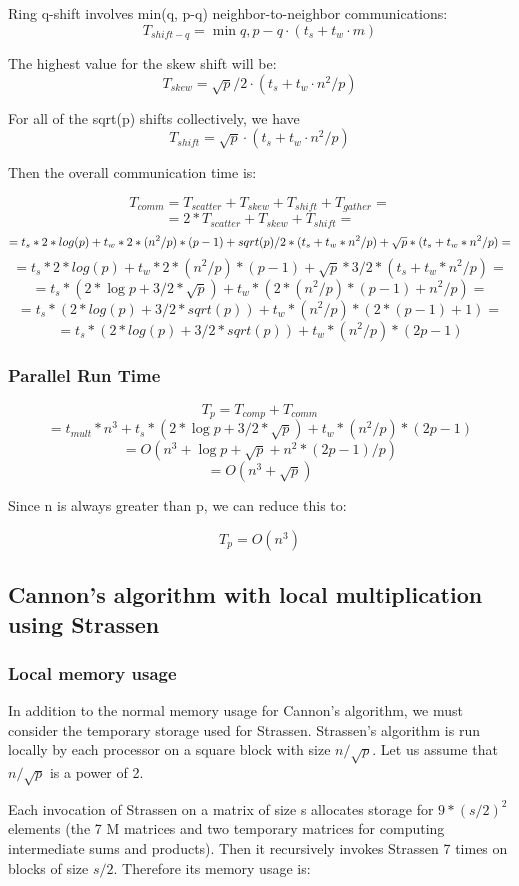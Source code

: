 \documentclass{article}
\begin{document}
Ring q-shift involves min(q, p-q) neighbor-to-neighbor communications:
$$T_{{shift-q}} = \min{q,p-q} \cdot (t_s + t_w \cdot m)$$

The highest value for the skew shift will be:
$$T_{{skew}} = \sqrt{p}/2 \cdot (t_s + t_w \cdot n^2/p)$$

For all of the sqrt(p) shifts collectively, we have
$$T_{{shift}} = \sqrt{p} \cdot (t_s + t_w \cdot n^2/p)$$

Then the overall communication time is:

$$T_{{comm}} = T_{{scatter}} + T_{{skew}} + T_{{shift}} + T_{{gather}} =$$
$$= 2*T_{{scatter}} + T_{{skew}} + T_{{shift}} =$$
$$= t_s*2*log(p) + t_w*2*(n^2/p)*(p-1) + sqrt(p)/2 * (t_s + t_w*n^2/p) + \\
\sqrt{p}*(t_s + t_w*n^2/p) = $$ $$= t_s*2*log(p) + t_w*2*(n^2/p)*(p-1) +
\sqrt{p}*3/2* (t_s + t_w*n^2/p) =$$ $$ = t_s*(2*\log{p} + 3/2*\sqrt{p}) +
t_w*(2*(n^2/p)*(p-1) + n^2/p) =$$ $$		= t_s*(2*log(p) + 3/2*sqrt(p)) + t_w*(n^2/p)*(2*(p-1) + 1) =$$
$$		= t_s*(2*log(p) + 3/2*sqrt(p)) + t_w*(n^2/p)*(2p-1)$$


\subsubsection{Parallel Run Time}

$$T_p = T_{{comp}} + T_{{comm}} $$
$$= t_{{mult}}*n^3 + t_s*(2*\log{p} + 3/2*\sqrt{p}) + t_w*(n^2/p)*(2p-1)$$
$$=O(n^3 + \log{p} + \sqrt{p} + n^2*(2p-1)/p)$$
$$=O(n^3 + \sqrt{p})$$

Since n is always greater than p, we can reduce this to:

$$T_p = O(n^3)$$

\subsection{Cannon's algorithm with local multiplication using Strassen}

\subsubsection{Local memory usage}

In addition to the normal memory usage for Cannon's algorithm, we must consider
the temporary storage used for Strassen. Strassen's algorithm is run locally by
each processor on a square block with size $n/\sqrt{p}$. Let us assume that
$n/\sqrt{p}$ is a power of 2.

Each invocation of Strassen on a matrix of size s allocates storage for
$9*(s/2)^2$ elements (the 7 M matrices and two temporary matrices for computing
intermediate sums and products). Then it recursively invokes Strassen 7 times on
blocks of size $s/2$. Therefore its memory usage is:
\end{document}

